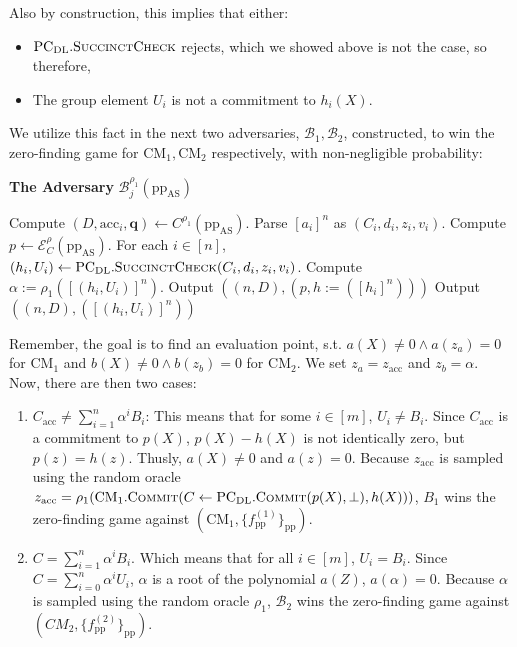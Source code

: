 \documentclass[
]{article}
\providecommand{\tightlist}{%
  \setlength{\itemsep}{0pt}\setlength{\parskip}{0pt}}
\newcommand*\Bc{\mathcal{B}}
\newcommand*\Ec{\mathcal{E}}
\renewcommand*\a{\alpha}
\renewcommand{\vec}[1]{ \boldsymbol{#1} }
\newcommand*{\from}{\gets}
\newcommand*{\pp}{\mathrm{pp}}
\newcommand*{\acc}{\mathrm{acc}}
\newcommand*{\Commit}{\mathrm{\text{C{\scriptsize OMMIT}}}}
\newcommand*{\AS}{\text{AS}}
\newcommand*{\PCDL}{\text{PC}_{\text{DL}}}
\newcommand*{\PCDLCommit}{\PCDL.\Commit}
\newcommand*{\PCDLSuccinctCheck}{\PCDL.\mathrm{\text{S{\scriptsize UCCINCT}C{\scriptsize HECK}}}}
\newcommand*{\CM}{\mathrm{\text{CM}}}
\begin{document}
Also by construction, this implies that either:

\begin{itemize}
\tightlist
\item
  \(\PCDLSuccinctCheck\) rejects, which we showed above is not the case,
  so therefore,
\item
  The group element \(U_i\) is not a commitment to \(h_i(X)\).
\end{itemize}

We utilize this fact in the next two adversaries, \(\Bc_1, \Bc_2\),
constructed, to win the zero-finding game for \(\CM_1, \CM_2\)
respectively, with non-negligible probability:

\begin{algorithm}[H]
\caption*{\textbf{The Adversary} $\Bc_j^{\rho_1}(\pp_\AS)$}
\begin{algorithmic}[1]
  \State Compute $(D, \acc_i, \vec{q}) \leftarrow C^{\rho_1}(\pp_\AS)$.
  \State Parse $[a_i]^n$ as $(C_i, d_i, z_i, v_i)$.
  \State Compute $p \leftarrow \Ec_C^\rho(\pp_\AS)$.
  \State For each $i \in [n]$, $(h_i, U_i) \from \PCDLSuccinctCheck(C_i, d_i, z_i, v_i)$.
  \State Compute $\a := \rho_1([(h_i, U_i)]^n)$.
    \State Output $((n, D), (p, h := ([h_i]^n)))$
    \State Output $((n, D), ([(h_i, U_i)]^n))$
  \EndIf
\end{algorithmic}
\end{algorithm}

Remember, the goal is to find an evaluation point, s.t.
\(a(X) \neq 0 \land
a(z_a) = 0\) for \(\CM_1\) and \(b(X) \neq 0 \land b(z_b) = 0\) for
\(\CM_2\). We set \(z_a = z_\acc\) and \(z_b = \a\). Now, there are then
two cases:

\begin{enumerate}
\def\labelenumi{\arabic{enumi}.}
\item
  \(C_\acc \neq \sum_{i=1}^n \a^i B_i\): This means that for some
  \(i \in [m]\), \(U_i \neq B_i\). Since \(C_\acc\) is a commitment to
  \(p(X)\), \(p(X) - h(X)\) is not identically zero, but
  \(p(z) = h(z)\). Thusly, \(a(X) \neq 0\) and \(a(z) = 0\). Because
  \(z_\acc\) is sampled using the random oracle
  \(z_\acc = \rho_1(\CM_1.\Commit(C \from \PCDLCommit(p(X), \bot), h(X)))\),
  \(B_1\) wins the zero-finding game against \((\CM_1,
  \{f_\pp^{(1)}\}_\pp)\).
\item
  \(C = \sum_{i=1}^n \a^i B_i\). Which means that for all \(i \in [m]\),
  \(U_i =
  B_i\). Since \(C = \sum_{i=0}^n \a^i U_i\), \(\a\) is a root of the
  polynomial \(a(Z)\), \(a(\a) = 0\). Because \(\a\) is sampled using
  the random oracle \(\rho_1\), \(\Bc_2\) wins the zero-finding game
  against \((CM_2,
  \{f_\pp^{(2)}\}_\pp)\).
\end{enumerate}
\end{document}
